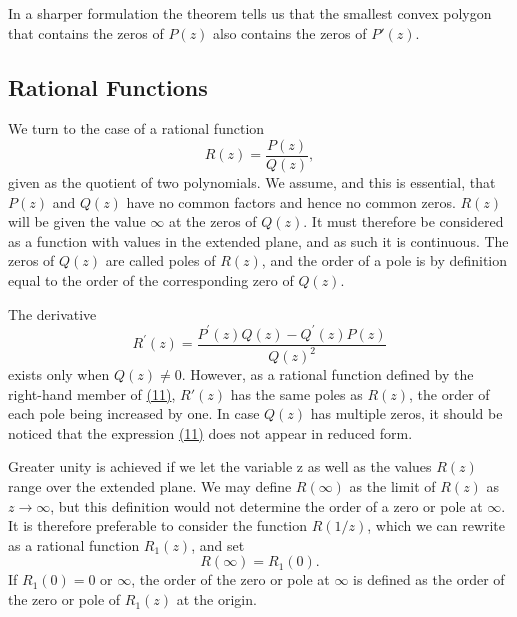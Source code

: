 In a sharper formulation the theorem tells us that the smallest convex polygon that contains the zeros of $P(z)$ also contains the zeros of $P'(z)$.


\setcounter{section}{1}\setcounter{subsection}{3}\subsection{Rational Functions}\label{sec:2.1.4}
We turn to the case of a rational function
\begin{equation*}
R (z) = \frac {P (z)}{Q (z)},\tag{10}\label{eq:2.10}
\end{equation*}
given as the quotient of two polynomials. We assume, and this is essential, that $P(z)$ and $Q(z)$ have no common factors and hence no common zeros. $R(z)$ will be given the value $\infty$ at the zeros of $Q(z)$. It must therefore be considered as a function with values in the extended plane, and as such it is continuous. The zeros of $Q(z)$ are called poles of $R(z)$, and the order of a pole is by definition equal to the order of the corresponding zero of $Q(z)$.

The derivative
\begin{equation*}
R ^ {\prime} (z) = \frac {P ^ {\prime} (z) Q (z) - Q ^ {\prime} (z) P (z)}{Q (z) ^ {2}}\tag{11}\label{eq:2.11}
\end{equation*}
exists only when $Q(z) \neq 0$. However, as a rational function defined by the right-hand member of \hyperref[eq:2.11]{(11)}, $R'(z)$ has the same poles as $R(z)$, the order of each pole being increased by one. In case $Q(z)$ has multiple zeros, it should be noticed that the expression \hyperref[eq:2.11]{(11)} does not appear in reduced form.

Greater unity is achieved if we let the variable z as well as the values $R(z)$ range over the extended plane. We may define $R(\infty)$ as the limit of $R(z)$ as $z \to \infty$, but this definition would not determine the order of a zero or pole at $\infty$. It is therefore preferable to consider the function $R(1/z)$, which we can rewrite as a rational function $R_{1}(z)$, and set
\begin{equation*}
R (\infty) = R _ {1} (0).
\end{equation*}
If $R_{1}(0) = 0$ or $\infty$, the order of the zero or pole at $\infty$ is defined as the order of the zero or pole of $R_{1}(z)$ at the origin.

